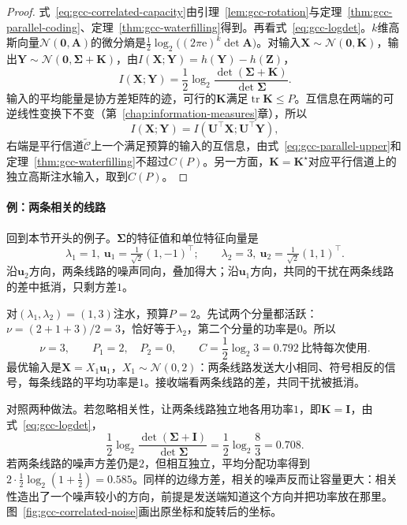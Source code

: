 \begin{proof}
式~\eqref{eq:gcc-correlated-capacity}由引理~\ref{lem:gcc-rotation}与定理~\ref{thm:gcc-parallel-coding}、定理~\ref{thm:gcc-waterfilling}得到。再看式~\eqref{eq:gcc-logdet}。$k$维高斯向量$\mathcal{N}(\bm{0},\bm{A})$的微分熵是$\frac12\log_2\bigl((2\pi\mathrm{e})^k\det\bm{A}\bigr)$。对输入$\bm{X}\sim\mathcal{N}(\bm{0},\bm{K})$，输出$\bm{Y}\sim\mathcal{N}(\bm{0},\bm{\Sigma}+\bm{K})$，由$I(\bm{X};\bm{Y})=h(\bm{Y})-h(\bm{Z})$，
\[
 I(\bm{X};\bm{Y})=\frac12\log_2\frac{\det(\bm{\Sigma}+\bm{K})}{\det\bm{\Sigma}} .
\]
输入的平均能量是协方差矩阵的迹，可行的$\bm{K}$满足$\operatorname{tr}\bm{K}\leq P$。互信息在两端的可逆线性变换下不变（第~\ref{chap:information-measures}章），所以
\[
 I(\bm{X};\bm{Y})=I(\bm{U}^{\top}\bm{X};\bm{U}^{\top}\bm{Y}) ,
\]
右端是平行信道$\tilde{\mathcal{C}}$上一个满足预算的输入的互信息，由式~\eqref{eq:gcc-parallel-upper}和定理~\ref{thm:gcc-waterfilling}不超过$C(P)$。另一方面，$\bm{K}=\bm{K}^{\star}$对应平行信道上的独立高斯注水输入，取到$C(P)$。
\end{proof}

\paragraph{例：两条相关的线路}
回到本节开头的例子。$\bm{\Sigma}$的特征值和单位特征向量是
\[
 \lambda_1=1,\ \bm{u}_1=\tfrac{1}{\sqrt2}(1,-1)^{\top};\qquad \lambda_2=3,\ \bm{u}_2=\tfrac{1}{\sqrt2}(1,1)^{\top} .
\]
沿$\bm{u}_2$方向，两条线路的噪声同向，叠加得大；沿$\bm{u}_1$方向，共同的干扰在两条线路的差中抵消，只剩方差$1$。

对$(\lambda_1,\lambda_2)=(1,3)$注水，预算$P=2$。先试两个分量都活跃：$\nu=(2+1+3)/2=3$，恰好等于$\lambda_2$，第二个分量的功率是$0$。所以
\[
 \nu=3,\qquad P_1=2,\quad P_2=0,\qquad C=\frac12\log_2 3=0.792\ \text{比特每次使用}.
\]
最优输入是$\bm{X}=X_1\bm{u}_1$，$X_1\sim\mathcal{N}(0,2)$：两条线路发送大小相同、符号相反的信号，每条线路的平均功率是$1$。接收端看两条线路的差，共同干扰被抵消。

对照两种做法。若忽略相关性，让两条线路独立地各用功率$1$，即$\bm{K}=\bm{I}$，由式~\eqref{eq:gcc-logdet}，
\[
 \frac12\log_2\frac{\det(\bm{\Sigma}+\bm{I})}{\det\bm{\Sigma}}=\frac12\log_2\frac{8}{3}=0.708 .
\]
若两条线路的噪声方差仍是$2$，但相互独立，平均分配功率得到$2\cdot\frac12\log_2(1+\frac12)=0.585$。同样的边缘方差，相关的噪声反而让容量更大：相关性造出了一个噪声较小的方向，前提是发送端知道这个方向并把功率放在那里。图~\ref{fig:gcc-correlated-noise}画出原坐标和旋转后的坐标。

